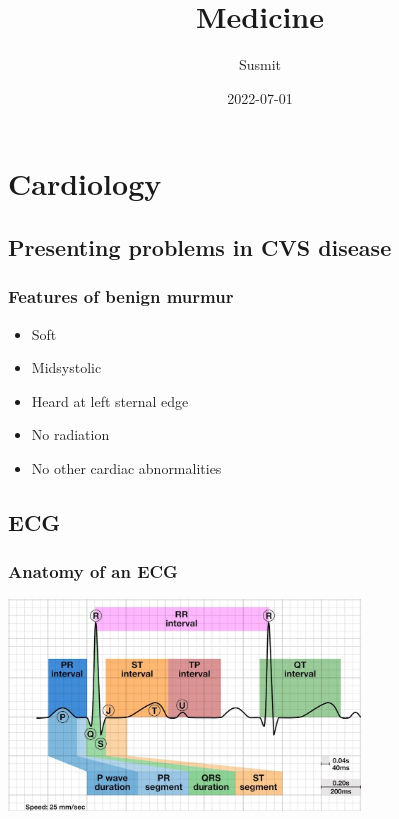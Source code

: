 \documentclass[
  12pt,
]{memoir}
\title{Medicine}
\author{Susmit}
\date{2022-07-01}
\providecommand{\tightlist}{%
  \setlength{\itemsep}{0pt}\setlength{\parskip}{0pt}}
\begin{document}
\frontmatter
\maketitle

\mainmatter
\openany
\raggedbottom
\twocoltocetc
\tableofcontents

\pagebreak

\hypertarget{cardiology}{%
\chapter{Cardiology}\label{cardiology}}

\hypertarget{presenting-problems-in-cvs-disease}{%
\section{Presenting problems in CVS
disease}\label{presenting-problems-in-cvs-disease}}

\hypertarget{features-of-benign-murmur}{%
\subsection{Features of benign murmur}\label{features-of-benign-murmur}}

\begin{itemize}
\tightlist
\item
  Soft
\item
  Midsystolic
\item
  Heard at left sternal edge
\item
  No radiation
\item
  No other cardiac abnormalities
\end{itemize}

\hypertarget{ecg}{%
\section{ECG}\label{ecg}}

\hypertarget{anatomy-of-an-ecg}{%
\subsection{Anatomy of an ECG}\label{anatomy-of-an-ecg}}

\includegraphics[width=0.7\textwidth]{../assets/ecg-anatomy.jpg}
\end{document}
